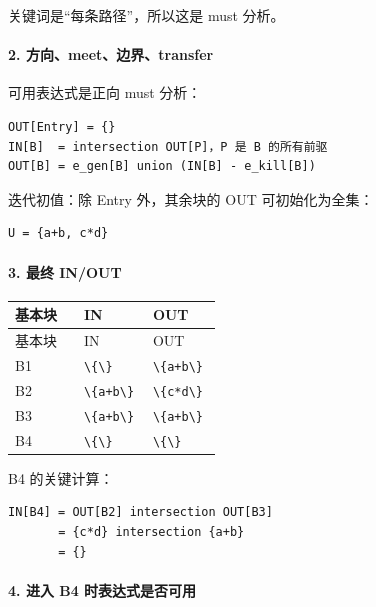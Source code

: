 \documentclass[UTF8]{ctexart}
\begin{document}
关键词是“每条路径”，所以这是 must 分析。

\paragraph*{2. 方向、meet、边界、transfer}

可用表达式是正向 must 分析：

\begin{Verbatim}[fontsize=\small,breaklines=true]
OUT[Entry] = {}
IN[B]  = intersection OUT[P]，P 是 B 的所有前驱
OUT[B] = e_gen[B] union (IN[B] - e_kill[B])
\end{Verbatim}

迭代初值：除 Entry 外，其余块的 OUT 可初始化为全集：

\begin{Verbatim}[fontsize=\small,breaklines=true]
U = {a+b, c*d}
\end{Verbatim}

\paragraph*{3. 最终 IN/OUT}

\begin{longtable}{|p{0.31\linewidth}|p{0.31\linewidth}|p{0.31\linewidth}|}
\hline
基本块 & IN & OUT \\
\hline
\endfirsthead
基本块 & IN & OUT \\
\hline
\endhead
B1 & \texttt{\textbackslash{}\{\textbackslash{}\}} & \texttt{\textbackslash{}\{a+b\textbackslash{}\}} \\
\hline
B2 & \texttt{\textbackslash{}\{a+b\textbackslash{}\}} & \texttt{\textbackslash{}\{c*d\textbackslash{}\}} \\
\hline
B3 & \texttt{\textbackslash{}\{a+b\textbackslash{}\}} & \texttt{\textbackslash{}\{a+b\textbackslash{}\}} \\
\hline
B4 & \texttt{\textbackslash{}\{\textbackslash{}\}} & \texttt{\textbackslash{}\{\textbackslash{}\}} \\
\hline
\end{longtable}

B4 的关键计算：

\begin{Verbatim}[fontsize=\small,breaklines=true]
IN[B4] = OUT[B2] intersection OUT[B3]
       = {c*d} intersection {a+b}
       = {}
\end{Verbatim}

\paragraph*{4. 进入 B4 时表达式是否可用}
\end{document}

